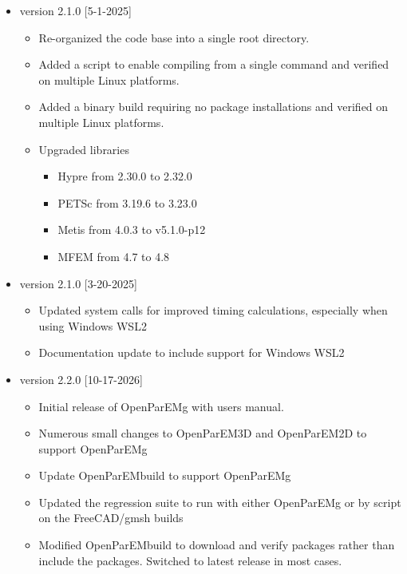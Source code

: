 \documentclass[titlepage]{article}
\renewcommand\_{\textunderscore\linebreak[1]}
\begin{document}
\begin{itemize}[nosep]
   \item version 2.1.0 [5-1-2025]
      \begin{itemize}[nosep]
         \item Re-organized the code base into a single root directory.
         \item Added a script to enable compiling from a single command and verified on multiple Linux platforms.
         \item Added a binary build requiring no package installations and verified on multiple Linux platforms.
         \item Upgraded libraries
            \begin{itemize}[nosep]
               \item Hypre from 2.30.0 to 2.32.0
               \item PETSc from 3.19.6 to 3.23.0
               \item Metis from 4.0.3 to v5.1.0-p12
               \item MFEM from 4.7 to 4.8
            \end{itemize}
      \end{itemize}

   \item version 2.1.0 [3-20-2025]
      \begin{itemize}[nosep]
         \item Updated system calls for improved timing calculations, especially when using Windows WSL2
         \item Documentation update to include support for Windows WSL2
      \end{itemize}

   \item version 2.2.0 [10-17-2026]
      \begin{itemize}[nosep]
         \item Initial release of OpenParEMg with users manual.
         \item Numerous small changes to OpenParEM3D and OpenParEM2D to support OpenParEMg
         \item Update OpenParEM\_build to support OpenParEMg
         \item Updated the regression suite to run with either OpenParEMg or by script on the FreeCAD/gmsh builds
         \item Modified OpenParEM\_build to download and verify packages rather than include the packages.  Switched to latest release in most cases.
      \end{itemize}


\end{itemize}
\end{document}
